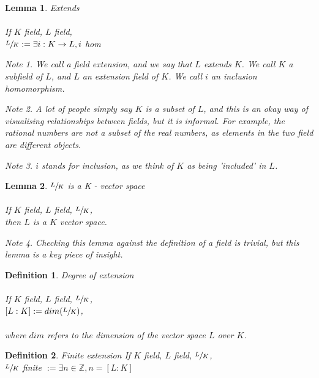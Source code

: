 \documentclass{article}
\theoremstyle{definitionstyle}
\newtheorem{defn}{Definition}[section]
\theoremstyle{lemmastyle}
\newtheorem{lem}{Lemma}[section]
\theoremstyle{remark}
\newtheorem*{note}{Note}
\begin{document}
\begin{lem} Extends\\
\\
If $K$ field, $L$ field,\\

$\sfrac{L}{K} := \exists i : K \to L, i $ hom\\

\begin{note} We call   a field extension, and we say that $L$ extends $K$. We call $K$ a subfield of $L$, and $L$ an extension field of $K$. We call $i$ an inclusion homomorphism.\\ \end{note}
\begin{note} A lot of people simply say $K$ is a subset of $L$, and this is an okay way of visualising relationships between fields, but it is informal. For example, the rational numbers are not a subset of the real numbers, as elements in the two field are different objects.\\ \end{note}
\begin{note} $i$ stands for inclusion, as we think of $K$ as being 'included' in $L$.\end{note}
\end{lem}

\begin{lem} $\sfrac{L}{K}$ is a K - vector space\\
\\
If $K$ field, $L$ field, $\sfrac{L}{K}$,\\

then $L$ is a $K$ vector space.\\
\begin{note} Checking this lemma against the definition of a field is trivial, but this lemma is a key piece of insight. \end{note}
\end{lem}

\begin{defn} Degree of extension\\
\\
If $K$ field, $L$ field, $\sfrac{L}{K}$,\\

$[L:K]:=dim(\sfrac{L}{K})$,\\
\\
where $dim$ refers to the dimension of the vector space $L$ over $K$.
\end{defn}
\begin{defn} Finite extension
If $K$ field, $L$ field, $\sfrac{L}{K}$,\\

$\sfrac{L}{K}$ finite $:= \exists n \in \mathbb{Z}, n = [L:K]$\\
\end{defn}
\end{document}
